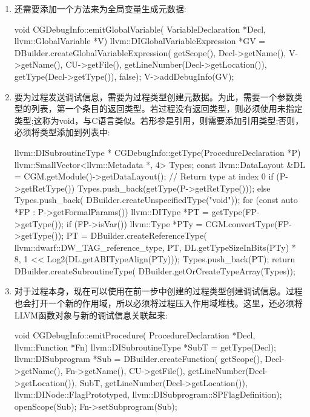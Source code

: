 \begin{enumerate}
\item
还需要添加一个方法来为全局变量生成元数据:

\begin{cpp}
void CGDebugInfo::emitGlobalVariable(
VariableDeclaration *Decl,
llvm::GlobalVariable *V) {
    llvm::DIGlobalVariableExpression *GV =
        DBuilder.createGlobalVariableExpression(
            getScope(), Decl->getName(), V->getName(),
            CU->getFile(),
            getLineNumber(Decl->getLocation()),
            getType(Decl->getType()), false);
    V->addDebugInfo(GV);
}
\end{cpp}

\item
要为过程发送调试信息，需要为过程类型创建元数据。为此，需要一个参数类型的列表，第一个条目的返回类型。若过程没有返回类型，则必须使用未指定类型;这称为void，与C语言类似。若形参是引用，则需要添加引用类型;否则，必须将类型添加到列表中:

\begin{cpp}
llvm::DISubroutineType *
CGDebugInfo::getType(ProcedureDeclaration *P) {
    llvm::SmallVector<llvm::Metadata *, 4> Types;
    const llvm::DataLayout &DL =
        CGM.getModule()->getDataLayout();
    // Return type at index 0
    if (P->getRetType())
        Types.push_back(getType(P->getRetType()));
    else
        Types.push_back(
            DBuilder.createUnspecifiedType("void"));
    for (const auto *FP : P->getFormalParams()) {
        llvm::DIType *PT = getType(FP->getType());
        if (FP->isVar()) {
            llvm::Type *PTy = CGM.convertType(FP->getType());
            PT = DBuilder.createReferenceType(
                llvm::dwarf::DW_TAG_reference_type, PT,
                DL.getTypeSizeInBits(PTy) * 8,
                1 << Log2(DL.getABITypeAlign(PTy)));
        }
        Types.push_back(PT);
    }
    return DBuilder.createSubroutineType(
        DBuilder.getOrCreateTypeArray(Types));
}
\end{cpp}

\item
对于过程本身，现在可以使用在前一步中创建的过程类型创建调试信息。过程也会打开一个新的作用域，所以必须将过程压入作用域堆栈。这里，还必须将LLVM函数对象与新的调试信息关联起来:

\begin{cpp}
void CGDebugInfo::emitProcedure(
        ProcedureDeclaration *Decl, llvm::Function *Fn) {
    llvm::DISubroutineType *SubT = getType(Decl);
    llvm::DISubprogram *Sub = DBuilder.createFunction(
        getScope(), Decl->getName(), Fn->getName(),
        CU->getFile(), getLineNumber(Decl->getLocation()),
        SubT, getLineNumber(Decl->getLocation()),
        llvm::DINode::FlagPrototyped,
        llvm::DISubprogram::SPFlagDefinition);
    openScope(Sub);
    Fn->setSubprogram(Sub);
}
\end{cpp}


\end{enumerate}
